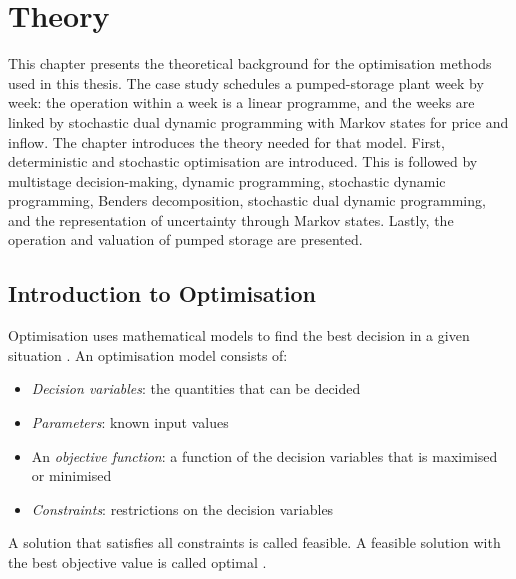 
\section{Theory}

This chapter presents the theoretical background for the optimisation methods used in this thesis. The case study schedules a pumped-storage plant week by week: the operation within a week is a linear programme, and the weeks are linked by stochastic dual dynamic programming with Markov states for price and inflow. The chapter introduces the theory needed for that model. First, deterministic and stochastic optimisation are introduced. This is followed by multistage decision-making, dynamic programming, stochastic dynamic programming, Benders decomposition, stochastic dual dynamic programming, and the representation of uncertainty through Markov states. Lastly, the operation and valuation of pumped storage are presented.

\subsection{Introduction to Optimisation}
\label{subsec:optimisation_intro}

Optimisation uses mathematical models to find the best decision in a
given situation \parencite{lundgren2010}. An optimisation model consists
of:
\begin{itemize}
\item \emph{Decision variables}: the quantities that can be decided
\item \emph{Parameters}: known input values
\item An \emph{objective function}: a function of the decision variables
  that is maximised or minimised
\item \emph{Constraints}: restrictions on the decision variables
\end{itemize}
A solution that satisfies all constraints is called feasible. A feasible
solution with the best objective value is called optimal
\parencite{lundgren2010}.

